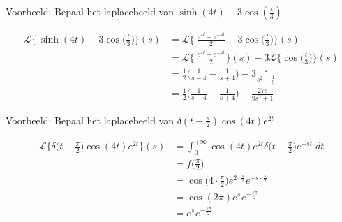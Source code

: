 \documentclass[12pt]{report}
\newcommand{\example}[2]{
      \hrulefill
      
      Voorbeeld: #1
      
      #2
      
      \hrulefill
}
\begin{document}
\example{Bepaal het laplacebeeld van $\sinh(4t) - 3\cos{(\frac{t}{3})}$}
{
\begin{equation*}
 \begin{split}
  \mathcal{L}\bigg\{\ \sinh(4t) - 3\cos{\bigg(\frac{t}{3}\bigg)} \bigg\}(s) & = \mathcal{L}\bigg\{\ \frac{e^{4t} - e^{-4t}}{2} - 3\cos{\bigg(\frac{t}{3}\bigg)} \bigg\}(s) \\
  & = \mathcal{L}\bigg\{\ \frac{e^{4t} - e^{-4t}}{2}\bigg\}(s) - 3\mathcal{L}\bigg\{\cos{\bigg(\frac{t}{3}\bigg)} \bigg\}(s) \\
  & = \frac{1}{2}\bigg(\frac{1}{s - 4} - \frac{1}{s + 4}\bigg) - 3\frac{s}{s^2 + \frac{1}{9}} \\
  & = \frac{1}{2}\bigg(\frac{1}{s - 4} - \frac{1}{s + 4}\bigg) - \frac{27s}{9s^2 + 1}
 \end{split}
\end{equation*}
}
\example{Bepaal het laplacebeeld van $\delta(t - \frac{\pi}{2})\cos(4t)e^{2t}$}{
\begin{equation*}
 \begin{split}
  \mathcal{L}\bigg\{\delta\bigg(t - \frac{\pi}{2}\bigg)\cos(4t)e^{2t}\bigg\}(s) & = \int_{0}^{+\infty}\cos(4t)e^{2t}\delta\bigg(t - \frac{\pi}{2}\bigg)e^{-st} \; dt \\
  & = f\bigg(\frac{\pi}{2}\bigg) \\
  & = \cos\bigg(4 \cdot \frac{\pi}{2}\bigg)e^{2\cdot\frac{\pi}{2}}e^{-s\cdot\frac{\pi}{2}} \\
  & = \cos(2\pi)e^{\pi}e^{-\frac{s\pi}{2}}\\
  & = e^{\pi}e^{-\frac{s\pi}{2}}
 \end{split}
\end{equation*}

}
\end{document}
